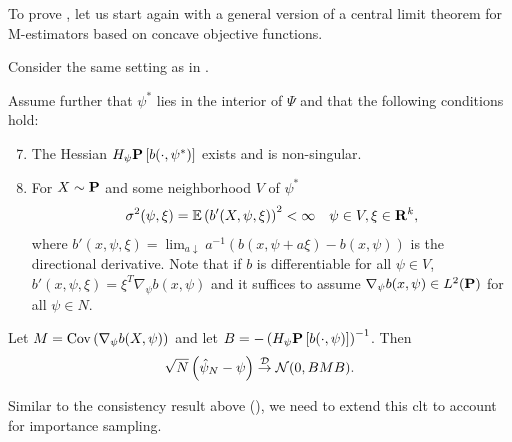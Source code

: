 To prove , let us start again with a general version of a central limit theorem for M-estimators based on concave objective functions. 
\begin{theorem}
    \label{thm:haberman-clt}
    Consider the same setting as in . 

    Assume further that $\psi^{\ast}$ lies in the interior of $\Psi$ and that the following conditions hold: 
    \begin{enumerate}[label=(C\arabic*),ref=(C\arabic*)]
        \setcounter{enumi}{6}
        \item\label{it:C7} The Hessian $H_{\psi} \P \left[ b(\cdot, \psi^{\ast}) \right]$ exists and is non-singular.
        \setcounter{enumi}{9}
        \item\label{it:C10} For $X\sim \P$ and some neighborhood $V$ of $\psi^{\ast}$ 
        \begin{align*}
            \sigma^{2}(\psi, \xi) = \mathbb E \left( b'(X, \psi, \xi)  \right)^{2} < \infty && \psi \in V, \xi \in \R^{k},
        \end{align*}
        where $b'(x, \psi, \xi) = \lim_{a \downarrow} a^{-1} \left( b(x, \psi + a\xi) - b(x, \psi)\right)$ is the directional derivative. Note that if $b$ is differentiable for all $\psi \in V$, $b'(x, \psi, \xi) = \xi^{T}\nabla_{\psi} b(x, \psi)$ and it suffices to assume $\nabla_{\psi} b(x,\psi) \in L^{2} (\P)$ for all $\psi \in N$.
    \end{enumerate}
    
    Let $M = \cov \left( \nabla_{\psi} b(X, \psi) \right)$ and let $B = - \left(H_{\psi} \P \left[ b(\cdot, \psi) \right]\right)^{-1}$. Then 
    \begin{equation}
        \sqrt{N} \left( \hat\psi_{N} - \psi \right) \convD \Normal (0, BMB).
    \end{equation}
    
\end{theorem}

Similar to the consistency result above (), we need to extend this \acrshort{clt} to account for importance sampling.

